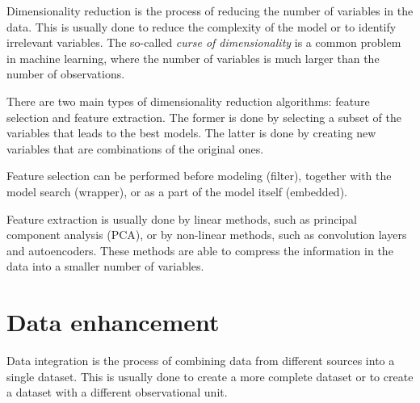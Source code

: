 Dimensionality reduction is the process of reducing the number of variables in the data.
This is usually done to reduce the complexity of the model or to identify irrelevant
variables.  The so-called \emph{curse of dimensionality} is a common problem in machine
learning, where the number of variables is much larger than the number of observations.

There are two main types of dimensionality reduction algorithms: feature selection and
feature extraction.  The former is done by selecting a subset of the variables that leads
to the best models.  The latter is done by creating new variables that are combinations
of the original ones.

Feature selection can be performed before modeling (filter), together with the model
search (wrapper), or as a part of the model itself (embedded).

Feature extraction is usually done by linear methods, such as principal component analysis
(PCA), or by non-linear methods, such as convolution layers and autoencoders.  These methods are able to
compress the information in the data into a smaller number of variables.



\section{Data enhancement}

Data integration is the process of combining data from different sources into a single
dataset.  This is usually done to create a more complete dataset or to create a dataset
with a different observational unit.

